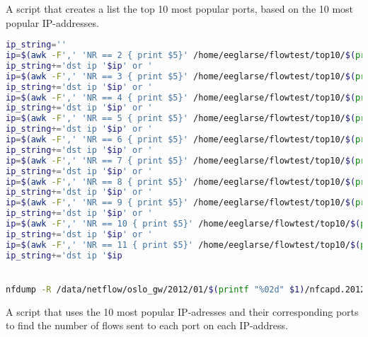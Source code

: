 A script that creates a list the top 10 most popular ports, based on the 10 most popular IP-addresses. 
\begin{lstlisting}[language=bash]
ip_string=''
ip=$(awk -F',' 'NR == 2 { print $5}' /home/eeglarse/flowtest/top10/$(printf "%02d" $1).csv)
ip_string+='dst ip '$ip' or '
ip=$(awk -F',' 'NR == 3 { print $5}' /home/eeglarse/flowtest/top10/$(printf "%02d" $1).csv)
ip_string+='dst ip '$ip' or '
ip=$(awk -F',' 'NR == 4 { print $5}' /home/eeglarse/flowtest/top10/$(printf "%02d" $1).csv)
ip_string+='dst ip '$ip' or '
ip=$(awk -F',' 'NR == 5 { print $5}' /home/eeglarse/flowtest/top10/$(printf "%02d" $1).csv)
ip_string+='dst ip '$ip' or '
ip=$(awk -F',' 'NR == 6 { print $5}' /home/eeglarse/flowtest/top10/$(printf "%02d" $1).csv)
ip_string+='dst ip '$ip' or '
ip=$(awk -F',' 'NR == 7 { print $5}' /home/eeglarse/flowtest/top10/$(printf "%02d" $1).csv)
ip_string+='dst ip '$ip' or '
ip=$(awk -F',' 'NR == 8 { print $5}' /home/eeglarse/flowtest/top10/$(printf "%02d" $1).csv)
ip_string+='dst ip '$ip' or '
ip=$(awk -F',' 'NR == 9 { print $5}' /home/eeglarse/flowtest/top10/$(printf "%02d" $1).csv)
ip_string+='dst ip '$ip' or '
ip=$(awk -F',' 'NR == 10 { print $5}' /home/eeglarse/flowtest/top10/$(printf "%02d" $1).csv)
ip_string+='dst ip '$ip' or '
ip=$(awk -F',' 'NR == 11 { print $5}' /home/eeglarse/flowtest/top10/$(printf "%02d" $1).csv)
ip_string+='dst ip '$ip


nfdump -R /data/netflow/oslo_gw/2012/01/$(printf "%02d" $1)/nfcapd.201201$(printf "%02d" $1)0000:nfcapd.201201$(printf "%02d" $1)2355 -n 10 -s dstport $iplist -o csv > /home/eeglarse/flowtest/top10/top10port/$(printf "%02d" $1).csv
\end{lstlisting}
A script that uses the 10 most popular IP-adresses and their corresponding ports to find the number of flows sent to each port on each IP-address. 
